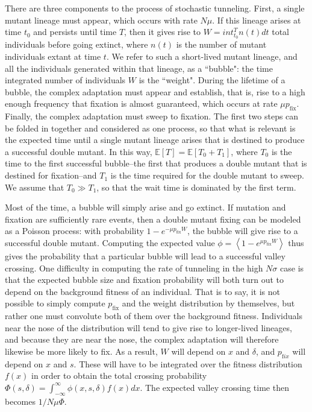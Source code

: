 \documentclass[rmp]{revtex4}
\begin{document}
There are three components to the process of stochastic tunneling.
First, a single mutant lineage must appear, which occurs with rate $N\mu$.
If this lineage arises at time $t_0$ and persists until time $T$, then it gives rise to $W = int_{t_0}^T n(t) dt$ total individuals before going extinct, where $n(t)$ is the number of mutant individuals extant at time $t$.
We refer to such a short-lived mutant lineage, and all the individuals generated within that lineage, as a ``bubble": the time integrated number of individuals $W$ is the ``weight".
During the lifetime of a bubble, the complex adaptation must appear and establish, that is, rise to a high enough frequency that fixation is almost guaranteed, which occurs at rate $\mu p_{\mathrm {fix}}$.
Finally, the complex adaptation must sweep to fixation.
The first two steps can be folded in together and considered as one process, so that what is relevant is the expected time until a single mutant lineage arises that is destined to produce a successful double mutant.
In this way, $\mathbb{E}\left[ T \right] = \mathbb{E} \left[ T_0 + T_1 \right]$, where $T_0$ is the time to the first successful bubble--the first that produces a double mutant that is destined for fixation--and $T_1$ is the time required for the double mutant to sweep.
We assume that $T_0 \gg T_1$, so that the wait time is dominated by the first term.

Most of the time, a bubble will simply arise and go extinct.
If mutation and fixation are sufficiently rare events, then a double mutant fixing can be modeled as a Poisson process: with probability $1-e^{-\mu p_{\mathrm{fix}} W}$, the bubble will give rise to a successful double mutant.
Computing the expected value $\phi = \left< 1-e^{\mu p_{\mathrm {fix}} W} \right>$ thus gives the probability that a particular bubble will lead to a successful valley crossing.
One difficulty in computing the rate of tunneling in the high $N\sigma$ case is that the expected bubble size and fixation probability will both turn out to depend on the background fitness of an individual.
That is to say, it is not possible to simply compute $p_{\mathrm{fix}}$ and the weight distribution by themselves, but rather one must convolute both of them over the background fitness.
Individuals near the nose of the distribution will tend to give rise to longer-lived lineages, and because they are near the nose, the complex adaptation will therefore likewise be more likely to fix.
As a result, $W$ will depend on $x$ and $\delta$, and $p_{\mathrm fix}$ will depend on $x$ and $s$.
These will have to be integrated over the fitness distribution $f(x)$ in order to obtain the total crossing probability $\Phi(s,\delta) = \int_{-\infty}^\infty \phi(x,s,\delta) f(x) dx$.
The expected valley crossing time then becomes $1/N\mu\Phi$.
\end{document}
